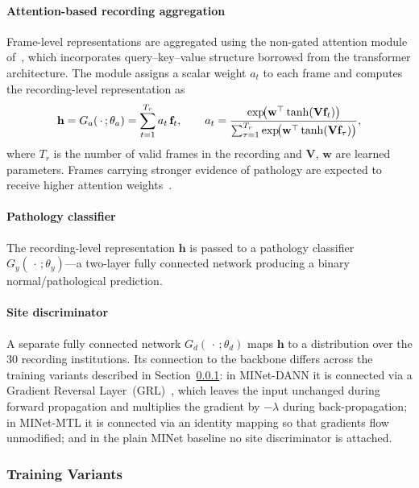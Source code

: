 \documentclass[preprint,12pt]{elsarticle}
\begin{document}
\paragraph{Attention-based recording aggregation}
Frame-level representations are aggregated using the non-gated
attention module of~\cite{poziomska2026quantity}, which incorporates
query--key--value structure borrowed from the transformer
architecture.
The module assigns a scalar weight $a_t$ to each frame and computes
the recording-level representation as
\begin{equation}
    \mathbf{h} =  G_a(\,\cdot\,; \theta_a)=\sum_{t=1}^{T_r} a_t\,\mathbf{f}_t, \qquad
    a_t = \frac{%
        \exp\!\bigl(\mathbf{w}^{\top}
        \tanh(\mathbf{V}\mathbf{f}_t)\bigr)}{%
        \sum_{\tau=1}^{T_r}
        \exp\!\bigl(\mathbf{w}^{\top}
        \tanh(\mathbf{V}\mathbf{f}_\tau)\bigr)},
\end{equation}
where $T_r$ is the number of valid frames in the recording and
$\mathbf{V}$, $\mathbf{w}$ are learned parameters.
Frames carrying stronger evidence of pathology are expected to
receive higher attention weights~\cite{poziomska2026quantity}.

\paragraph{Pathology classifier}
The recording-level representation $\mathbf{h}$ is passed to a
pathology classifier $G_y(\,\cdot\,;\theta_y)$---a two-layer fully
connected network producing a binary normal/pathological prediction.

\paragraph{Site discriminator}
A separate fully connected network $G_d(\,\cdot\,;\theta_d)$ maps
$\mathbf{h}$ to a distribution over the 30 recording institutions.
Its connection to the backbone differs across the training variants
described in Section~\ref{sec:training_variants}: in
\mbox{MINet-DANN} it is connected via a Gradient Reversal
Layer~(GRL)~\cite{ganin2016domain}, which leaves the input unchanged
during forward propagation and multiplies the gradient by $-\lambda$
during back-propagation; in \mbox{MINet-MTL} it is connected via an
identity mapping so that gradients flow unmodified; and in the plain
MINet baseline no site discriminator is attached.

\subsubsection{Training Variants}
\label{sec:training_variants}
\end{document}
